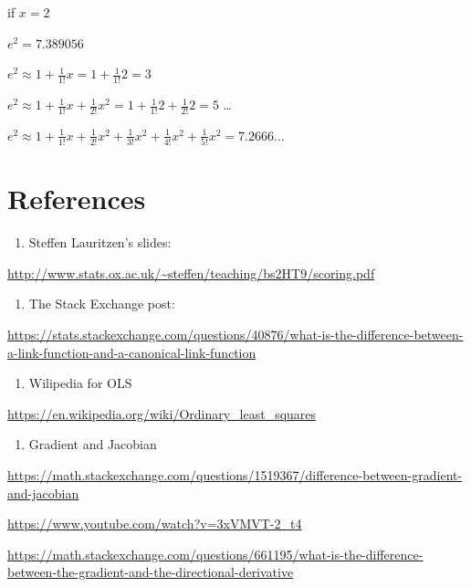 \documentclass[]{book}
\providecommand{\tightlist}{%
  \setlength{\itemsep}{0pt}\setlength{\parskip}{0pt}}
\begin{document}
if \(x=2\)

\(e^2 = 7.389056\)

\(e^2 \approx 1+\frac{1}{1!}x =1+\frac{1}{1!}2=3\)

\(e^2 \approx 1+\frac{1}{1!}x+\frac{1}{2!}x^2 =1+\frac{1}{1!}2 + \frac{1}{2!}2 =5\)
\ldots{}

\(e^2 \approx 1+\frac{1}{1!}x+\frac{1}{2!}x^2 +\frac{1}{3!}x^2+\frac{1}{4!}x^2+\frac{1}{5!}x^2=7.2666...\)

\section{References}\label{references-1}

\begin{enumerate}
\def\labelenumi{\arabic{enumi}.}
\tightlist
\item
  Steffen Lauritzen's slides:
\end{enumerate}

\url{http://www.stats.ox.ac.uk/~steffen/teaching/bs2HT9/scoring.pdf}

\begin{enumerate}
\def\labelenumi{\arabic{enumi}.}
\setcounter{enumi}{1}
\tightlist
\item
  The Stack Exchange post:
\end{enumerate}

\url{https://stats.stackexchange.com/questions/40876/what-is-the-difference-between-a-link-function-and-a-canonical-link-function}

\begin{enumerate}
\def\labelenumi{\arabic{enumi}.}
\setcounter{enumi}{2}
\tightlist
\item
  Wilipedia for OLS
\end{enumerate}

\url{https://en.wikipedia.org/wiki/Ordinary_least_squares}

\begin{enumerate}
\def\labelenumi{\arabic{enumi}.}
\setcounter{enumi}{3}
\tightlist
\item
  Gradient and Jacobian
\end{enumerate}

\url{https://math.stackexchange.com/questions/1519367/difference-between-gradient-and-jacobian}

\url{https://www.youtube.com/watch?v=3xVMVT-2_t4}

\url{https://math.stackexchange.com/questions/661195/what-is-the-difference-between-the-gradient-and-the-directional-derivative}
\end{document}
